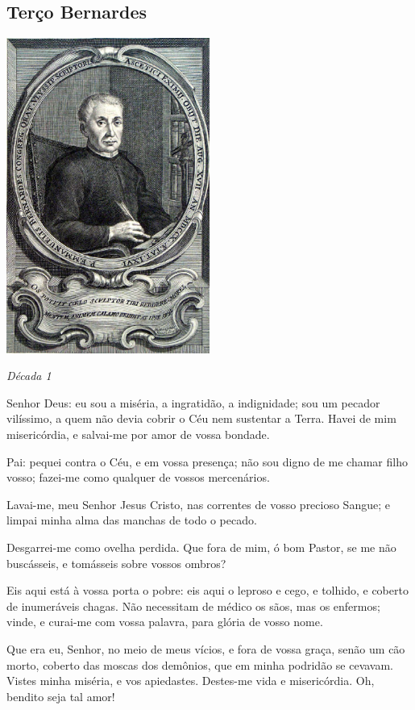 \subsection{Terço Bernardes}\label{tercobernardes}

\begin{nscenter}
\includegraphics[width=0.5\textwidth]{media/bernardes}
\end{nscenter}

\begin{nscenter} \emph{Década 1} \end{nscenter}

Senhor Deus: eu sou a miséria, a ingratidão, a indignidade; sou um pecador vilíssimo, a quem não devia cobrir o Céu nem sustentar a Terra. Havei de mim misericórdia, e salvai-me por amor de vossa bondade.

Pai: pequei contra o Céu, e em vossa presença; não sou digno de me chamar filho vosso; fazei-me como qualquer de vossos mercenários.

Lavai-me, meu Senhor Jesus Cristo, nas correntes de vosso precioso Sangue; e limpai minha alma das manchas de todo o pecado.

Desgarrei-me como ovelha perdida. Que fora de mim, ó bom Pastor, se me não buscásseis, e tomásseis sobre vossos ombros?

Eis aqui está à vossa porta o pobre: eis aqui o leproso e cego, e tolhido, e coberto de inumeráveis chagas. Não necessitam de médico os sãos, mas os enfermos; vinde, e curai-me com vossa palavra, para glória de vosso nome.

Que era eu, Senhor, no meio de meus vícios, e fora de vossa graça, senão um cão morto, coberto das moscas dos demônios, que em minha podridão se cevavam. Vistes minha miséria, e vos apiedastes. Destes-me vida e misericórdia. Oh, bendito seja tal amor!

